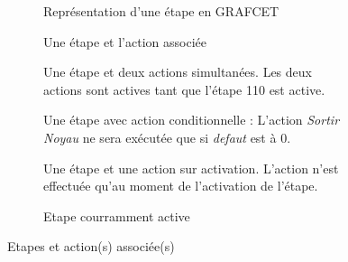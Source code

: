 \begin{figure}[ht]
\centering
  \begin{subfigure}[b]{.49\textwidth}
    \centering
    \caption{Représentation d'une étape en GRAFCET}
    \label{fig:etape}
  \end{subfigure}%
  \begin{subfigure}[b]{.49\textwidth}
    \centering
  \caption{Une étape et l'action associée}
  \label{fig:etapeAction}
  \end{subfigure}%

  \begin{subfigure}[b]{.48\textwidth}
    \centering
  \caption{Une étape et deux actions simultanées. Les deux actions sont actives tant que l'étape 110 est active.}
  \label{fig:etapeDeuxActions}
  \end{subfigure}\hfill
%
  \begin{subfigure}[b]{.48\textwidth}
    \centering
  \caption{Une étape avec action conditionnelle : L'action \textit{Sortir Noyau} ne sera exécutée que si \textit{defaut} est à 0.}
  \label{fig:etapeActionCond}
  \end{subfigure}%

  \begin{subfigure}[b]{.48\textwidth}
    \centering
  \caption{Une étape et une action sur activation. L'action n'est effectuée qu'au moment de l'activation de l'étape.}
  \label{fig:etapeActivation}
  \end{subfigure}%
  \begin{subfigure}[b]{.48\textwidth}
    \centering
  \caption{Etape courramment active}
  \label{fig:etapeActive}
  \end{subfigure}
  \caption{Etapes et action(s) associée(s)}%
\end{figure}


